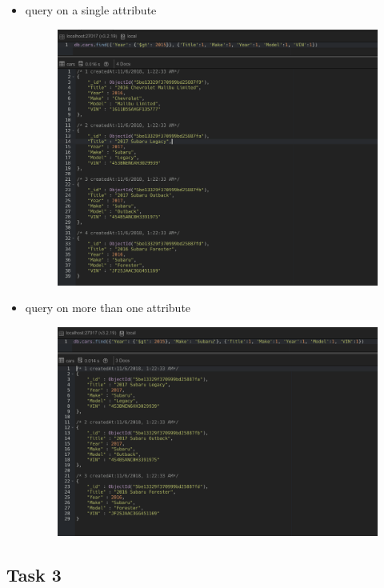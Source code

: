 \documentclass[11pt]{article}
\makeatletter
\def\maxwidth{\ifdim\Gin@nat@width>\linewidth\linewidth
    \else\Gin@nat@width\fi}
\let\Oldincludegraphics\includegraphics
\renewcommand{\includegraphics}[1]{\Oldincludegraphics[width=.8\maxwidth]{#1}}
\makeatother
\begin{document}
    \begin{itemize}
\item
  query on a single attribute
  
   \begin{figure}[H]
  	\centering
  	\includegraphics{2.png}
  	\caption{}
  \end{figure}
\item
  query on more than one attribute 
   \begin{figure}[H]
  	\centering
  	\includegraphics{3.png}
  	\caption{}
  \end{figure}
\end{itemize}

    \subsection*{Task 3}\label{task-3}
\end{document}
